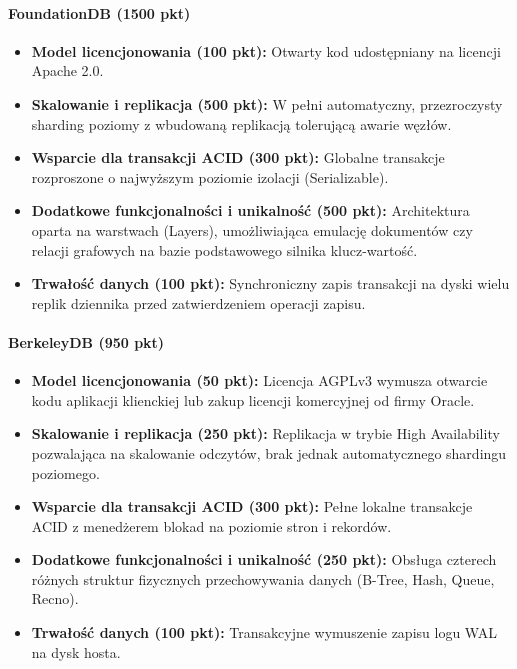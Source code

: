 \paragraph{FoundationDB (1500 pkt)}
\begin{itemize}
    \item \textbf{Model licencjonowania (100 pkt):} Otwarty kod udostępniany na licencji Apache 2.0.
    \item \textbf{Skalowanie i replikacja (500 pkt):} W pełni automatyczny, przezroczysty sharding poziomy z wbudowaną replikacją tolerującą awarie węzłów.
    \item \textbf{Wsparcie dla transakcji ACID (300 pkt):} Globalne transakcje rozproszone o najwyższym poziomie izolacji (Serializable).
    \item \textbf{Dodatkowe funkcjonalności i unikalność (500 pkt):} Architektura oparta na warstwach (Layers), umożliwiająca emulację dokumentów czy relacji grafowych na bazie podstawowego silnika klucz-wartość.
    \item \textbf{Trwałość danych (100 pkt):} Synchroniczny zapis transakcji na dyski wielu replik dziennika przed zatwierdzeniem operacji zapisu.
\end{itemize}

\paragraph{BerkeleyDB (950 pkt)}
\begin{itemize}
    \item \textbf{Model licencjonowania (50 pkt):} Licencja AGPLv3 wymusza otwarcie kodu aplikacji klienckiej lub zakup licencji komercyjnej od firmy Oracle.
    \item \textbf{Skalowanie i replikacja (250 pkt):} Replikacja w trybie High Availability pozwalająca na skalowanie odczytów, brak jednak automatycznego shardingu poziomego.
    \item \textbf{Wsparcie dla transakcji ACID (300 pkt):} Pełne lokalne transakcje ACID z menedżerem blokad na poziomie stron i rekordów.
    \item \textbf{Dodatkowe funkcjonalności i unikalność (250 pkt):} Obsługa czterech różnych struktur fizycznych przechowywania danych (B-Tree, Hash, Queue, Recno).
    \item \textbf{Trwałość danych (100 pkt):} Transakcyjne wymuszenie zapisu logu WAL na dysk hosta.
\end{itemize}
